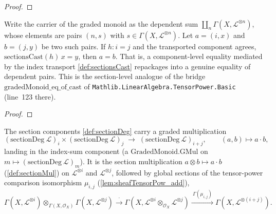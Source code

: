 \begin{proof}\leanok\end{proof}

\begin{lemma}
  \label{lem:gradedMonoid_eq_of_cast}
  Write the carrier of the graded monoid as the dependent sum
  \(\coprod_{n} \Gamma(X, \mathcal{L}^{\otimes n})\), whose elements are pairs
  \((n, s)\) with \(s \in \Gamma(X, \mathcal{L}^{\otimes n})\). Let
  \(a = (i, x)\) and \(b = (j, y)\) be two such pairs. If \(h : i = j\) and the
  transported component agrees, \(\mathrm{sectionsCast}(h)\,x = y\), then
  \(a = b\). That is, a component-level equality mediated by the index transport
  \cref{def:sectionsCast} repackages into a genuine equality of dependent pairs.
  This is the section-level analogue of the bridge
  \(\mathrm{gradedMonoid\_eq\_of\_cast}\) of
  \texttt{Mathlib.LinearAlgebra.TensorPower.Basic} (line~123 there).
\end{lemma}

\begin{proof}
  \leanok
\end{proof}

\begin{definition}
  \label{def:sectionGradedGMul}
  The section components \cref{def:sectionDeg} carry a graded multiplication
  \[
    (\mathrm{sectionDeg}\ \mathcal{L})_i \times
      (\mathrm{sectionDeg}\ \mathcal{L})_j
    \;\longrightarrow\; (\mathrm{sectionDeg}\ \mathcal{L})_{i+j},
    \qquad (a, b) \longmapsto a \cdot b,
  \]
  landing in the index-sum component (a \(\mathrm{GradedMonoid.GMul}\) on
  \(m \mapsto (\mathrm{sectionDeg}\ \mathcal{L})_m\)). It is the section
  multiplication \(a \otimes b \mapsto a \cdot b\) (\cref{def:sectionMul}) on
  \(\mathcal{L}^{\otimes i}\) and \(\mathcal{L}^{\otimes j}\), followed by global
  sections of the tensor-power comparison isomorphism \(\mu_{i,j}\)
  (\cref{lem:sheafTensorPow_add}),
  \[
    \Gamma(X, \mathcal{L}^{\otimes i}) \otimes_{\Gamma(X,\mathcal{O}_X)}
      \Gamma(X, \mathcal{L}^{\otimes j})
    \xrightarrow{\ \cdot\ }
    \Gamma(X, \mathcal{L}^{\otimes i} \otimes_{\mathcal{O}_X}
      \mathcal{L}^{\otimes j})
    \xrightarrow{\ \Gamma(\mu_{i,j})\ }
    \Gamma(X, \mathcal{L}^{\otimes (i+j)}).
  \]
\end{definition}

